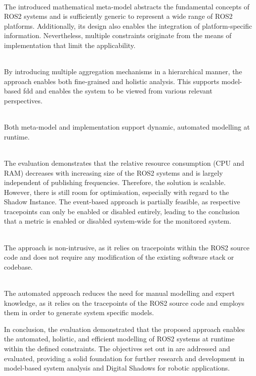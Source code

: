 \begin{description}[leftmargin=.5cm]
    \item[Generic Meta-Model for ROS2 Systems] \hfill \\
    The introduced mathematical meta-model abstracts the fundamental concepts of ROS2 systems and is sufficiently generic to represent a wide range of ROS2 platforms. Additionally, its design also enables the integration of platform-specific information. Nevertheless, multiple constraints originate from the means of implementation that limit the applicability.

    \item[Holistic Perspectives onto ROS2 Systems] \hfill \\
    By introducing multiple aggregation mechanisms in a hierarchical manner, the approach enables both fine-grained and holistic analysis. This supports model-based \acl{fdd} and enables the system to be viewed from various relevant perspectives.

    \item[Runtime Representation] \hfill \\
    Both meta-model and implementation support dynamic, automated modelling at runtime.

    \item[Lightweight Digital Shadow] \hfill \\
    The evaluation demonstrates that the relative resource consumption (CPU and RAM) decreases with increasing size of the ROS2 systems and is largely independent of publishing frequencies. Therefore, the solution is scalable. However, there is still room for optimisation, especially with regard to the Shadow Instance. The event-based approach is partially feasible, as respective tracepoints can only be enabled or disabled entirely, leading to the conclusion that a metric is enabled or disabled system-wide for the monitored system.

    \item[Non-Intrusiveness] \hfill \\
    The approach is non-intrusive, as it relies on tracepoints within the ROS2 source code and does not require any modification of the existing software stack or codebase.

    \item[Minimising Expert Knowledge] \hfill \\
    The automated approach reduces the need for manual modelling and expert knowledge, as it relies on the tracepoints of the ROS2 source code and employs them in order to generate system specific models.
\end{description}

In conclusion, the evaluation demonstrated that the proposed approach enables the automated, holistic, and efficient modelling of ROS2 systems at runtime within the defined constraints. The objectives set out in  are addressed and evaluated, providing a solid foundation for further research and development in model-based system analysis and Digital Shadows for robotic applications.
